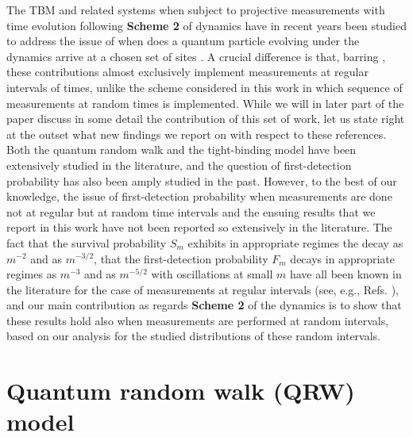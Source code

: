 \documentclass[12pt]{iopart}
\begin{document}
The TBM and related systems when subject to projective measurements with time evolution following {\bf Scheme 2} of dynamics have in recent years been studied to address the issue of when does a quantum particle evolving under the dynamics arrive at a chosen set of sites
\cite{Dhar:2015,Dhar:2015-1,Friedman:2017,Friedman:2017-1,Thiel:2018,Thiel:2019,Lahiri:2019,Meidan:2019,Yin:2019,Thiel:2020,Thiel:2020-1,Dubey:2021,Thiel:2021,Liu:2021,Kessler:2021}.  A crucial difference is that, barring \cite{Kessler:2021}, these contributions
almost exclusively implement measurements at regular intervals of times,  unlike the
scheme considered in this work in which sequence of measurements at random times is implemented.  While we will in later part of the paper discuss in some detail the contribution of this set of work,  let us state right at the outset what new findings we report on with respect to  these references.  Both the quantum random walk and the tight-binding model have been extensively studied in the literature, and the question of first-detection probability has also been amply studied in the past.  However, to the best of our knowledge,  the issue of first-detection probability when measurements are done not at regular but at random time intervals and the ensuing results that we report in this work have not been reported so extensively in the literature.  The fact that the survival probability $S_m$ exhibits in appropriate regimes the decay as $m^{-2}$ and as $m^{-3/2}$, that the first-detection probability $F_m$ decays in appropriate regimes as $m^{-3}$ and as $m^{-5/2}$ with oscillations at small $m$ have all been known in the literature for the case of measurements at regular intervals (see, e.g.,  Refs.  \cite{Dhar:2015,Friedman:2017-1}), and our main contribution as regards {\bf Scheme 2} of the dynamics is to show that these results hold also when measurements are performed at random intervals,  based on our analysis for the studied distributions of these random intervals. 

\section{Quantum random walk (QRW) model}
\label{sec:QRW}

\end{document}
